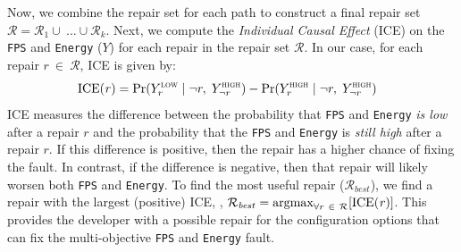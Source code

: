 Now, we combine the repair set for each path to construct a final repair set $\mathcal{R}=\mathcal{R}_{1} \cup~\ldots \cup\mathcal{R}_{k}$. Next, we compute the \textit{Individual Causal Effect} (ICE) on the \texttt{FPS} and \texttt{Energy} ($Y$) for each repair in the repair set $\mathcal{R}$. In our case, for each repair $\mathit{r}~\in~\mathcal{R}$, ICE is given by:
\begin{equation}
    \label{eq:ite}
    \footnotesize
    \mathrm{ICE}(\mathit{r})=\mathrm{Pr}(Y_r^{\textsc{low}}~|~\neg r,~Y_{\neg r}^{\textsc{high}}) - \mathrm{Pr}(Y_r^{\textsc{high}}~|~\neg r,~Y_{\neg r}^{\textsc{high}})\hspace{1em}
\end{equation}
ICE measures the difference between the probability that \texttt{FPS} and \texttt{Energy} \textit{is low} after a repair $r$ and the probability that the \texttt{FPS} and \texttt{Energy} is \textit{still high} after a repair $r$. If this difference is positive, then the repair has a higher chance of fixing the fault. In contrast, if the difference is negative, then that repair will likely worsen both \texttt{FPS} and \texttt{Energy}. To find the most useful repair ($\mathcal{R}_{\mathit{best}}$), we find a repair with the largest (positive) ICE, \ie, $\mathcal{R}_{\mathit{best}} = \operatorname*{argmax}_{\forall r~\in~\mathcal{R}}[\mathrm{ICE}(\mathit{r})]$. This provides the developer with a possible repair for the configuration options that can fix the multi-objective \texttt{FPS} and \texttt{Energy} fault. 



